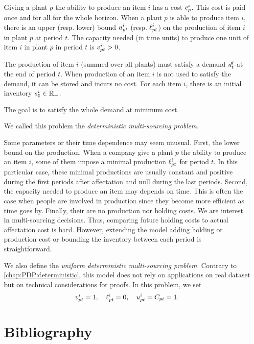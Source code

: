 Giving a plant $p$ the ability to produce an item $i$ has a cost $c_p^i$.
This cost is paid once and for all for the whole horizon.
When a plant $p$ is able to produce item $i$, there is an upper (resp. lower) bound $u_{pt}^i$ (resp. $\ell_{pt}^i$) on the production of item $i$ in plant $p$ at period $t$.
The capacity needed (in time units) to produce one unit of item $i$ in plant $p$ in period $t$ is $v_{pt}^i>0$.


The production of item $i$ (summed over all plants) must satisfy a demand $d_t^i$ at the end of period $t$.
When production of an item $i$ is not used to satisfy the demand, it can be stored and incurs no cost.
For each item $i$, there is an initial inventory $s_0^i\in\mathbb{R}_+$.


The goal is to satisfy the whole demand at minimum cost.


We called this problem the \emph{deterministic multi-sourcing problem}.


\medskip


Some parameters or their time dependence may seem unusual.
First, the lower bound on the production.
When a company give a plant $p$ the ability to produce an item $i$, some of them impose a minimal production $\ell_{pt}^i$ for period $t$.
In this particular case, these minimal productions are usually constant and positive during the first periods after affectation and null during the last periods.
Second, the capacity needed to produce an item may depends on time.
This is often the case when people are involved in production since they become more efficient as time goes by.
Finally, their are no production nor holding costs.
We are interest in multi-sourcing decisions.
Thus, comparing future holding costs to actual affectation cost is hard.
However, extending the model adding holding or production cost or bounding the inventory between each period is straightforward.


\medskip


We also define the \emph{uniform deterministic multi-sourcing problem}. Contrary to \cref{chap:PDP:deterministic}, this model does not rely on applications on real dataset but on technical considerations for proofs. In this problem, we set
$$
v_{pt}^i = 1
,\quad
\ell_{pt}^i = 0
,\quad
u_{pt}^i = C_{pt} = 1
.
$$


\section{Bibliography}



